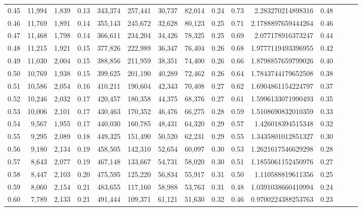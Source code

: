 \begin{tabular}{rrrrrrrrrrrrrrr}
0.45 &  11,994 &  1,839 &  0.13 &  343,374 &  257,441 &   30,737 &   82,014 &  0.24 &  0.73 &       2.283270214898316 &      0.48 \\
0.46 &  11,769 &  1,891 &  0.14 &  355,143 &  245,672 &   32,628 &   80,123 &  0.25 &  0.71 &      2.1788897659444264 &      0.46 \\
0.47 &  11,468 &  1,798 &  0.14 &  366,611 &  234,204 &   34,426 &   78,325 &  0.25 &  0.69 &       2.077178916373247 &      0.44 \\
0.48 &  11,215 &  1,921 &  0.15 &  377,826 &  222,989 &   36,347 &   76,404 &  0.26 &  0.68 &      1.9777119493396955 &      0.42 \\
0.49 &  11,030 &  2,004 &  0.15 &  388,856 &  211,959 &   38,351 &   74,400 &  0.26 &  0.66 &      1.8798857659799026 &      0.40 \\
0.50 &  10,769 &  1,938 &  0.15 &  399,625 &  201,190 &   40,289 &   72,462 &  0.26 &  0.64 &      1.7843744179652508 &      0.38 \\
0.51 &  10,586 &  2,054 &  0.16 &  410,211 &  190,604 &   42,343 &   70,408 &  0.27 &  0.62 &      1.6904861154224797 &      0.37 \\
0.52 &  10,246 &  2,032 &  0.17 &  420,457 &  180,358 &   44,375 &   68,376 &  0.27 &  0.61 &      1.5996133071990493 &      0.35 \\
0.53 &  10,006 &  2,101 &  0.17 &  430,463 &  170,352 &   46,476 &   66,275 &  0.28 &  0.59 &      1.5108690832010359 &      0.33 \\
0.54 &   9,567 &  1,955 &  0.17 &  440,030 &  160,785 &   48,431 &   64,320 &  0.29 &  0.57 &       1.426018394515348 &      0.32 \\
0.55 &   9,295 &  2,089 &  0.18 &  449,325 &  151,490 &   50,520 &   62,231 &  0.29 &  0.55 &      1.3435801012851327 &      0.30 \\
0.56 &   9,180 &  2,134 &  0.19 &  458,505 &  142,310 &   52,654 &   60,097 &  0.30 &  0.53 &      1.2621617546629298 &      0.28 \\
0.57 &   8,643 &  2,077 &  0.19 &  467,148 &  133,667 &   54,731 &   58,020 &  0.30 &  0.51 &      1.1855061152450976 &      0.27 \\
0.58 &   8,447 &  2,103 &  0.20 &  475,595 &  125,220 &   56,834 &   55,917 &  0.31 &  0.50 &       1.110588819611356 &      0.25 \\
0.59 &   8,060 &  2,154 &  0.21 &  483,655 &  117,160 &   58,988 &   53,763 &  0.31 &  0.48 &      1.0391038660410994 &      0.24 \\
0.60 &   7,789 &  2,133 &  0.21 &  491,444 &  109,371 &   61,121 &   51,630 &  0.32 &  0.46 &      0.9700224388253763 &      0.23 \\

\end{tabular}

